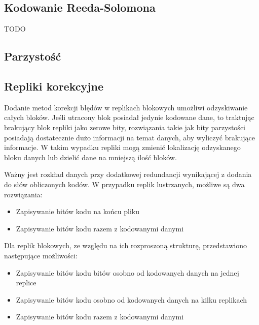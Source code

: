 \subsection{Kodowanie Reeda-Solomona}
TODO
\subsection{Parzystość}
\subsection{Repliki korekcyjne}

Dodanie metod korekcji błędów w replikach blokowych umożliwi odzyskiwanie całych bloków. Jeśli utracony blok posiadał jedynie kodowane dane, to traktując brakujący blok repliki jako zerowe bity, rozwiązania takie jak bity parzystości posiadają dostatecznie dużo informacji na temat danych, aby wyliczyć brakujące informacje. W takim wypadku repliki mogą zmienić lokalizację odzyskanego bloku danych lub dzielić dane na mniejszą ilość bloków. 

Ważny jest rozkład danych przy dodatkowej redundancji wynikającej z dodania do słów obliczonych kodów. W przypadku replik lustrzanych, możliwe są dwa rozwiązania:
\begin{itemize}
        \item Zapisywanie bitów kodu na końcu pliku
        \item Zapisywanie bitów kodu razem z kodowanymi danymi
\end{itemize}
Dla replik blokowych, ze względu na ich rozproszoną strukturę, przedstawiono następujące możliwości:
\begin{itemize}
        \item Zapisywanie bitów kodu bitów osobno od kodowanych danych na jednej replice
        \item Zapisywanie bitów kodu osobno od kodowanych danych na kilku replikach
        \item Zapisywanie bitów kodu razem z kodowanymi danymi
\end{itemize}

